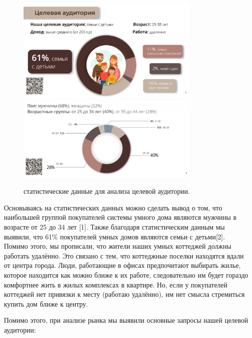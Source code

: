 \begin{figure}[h!]
	\centering
	\includegraphics[width=0.8\textwidth]{./graphics/img/image32.png}
	\includegraphics[width=0.8\textwidth]{./graphics/img/image14.png}
	\caption{статистические данные для анализа целевой аудитории.}
\end{figure}

Основываясь на статистических данных можно сделать вывод о том, что наибольшей группой покупателей системы умного дома являются мужчины в возрасте от 25 до 34 лет [1]. Также благодаря статистическим данным мы выявили, что 61\% покупателей умных домов являются семьи с детьми[2]. Помимо этого, мы прописали, что жители наших умных коттеджей должны работать удалённо. Это связано с тем, что коттеджные поселки находятся вдали от центра города. Люди, работающие в офисах предпочитают выбирать жилье, которое находится как можно ближе к их работе, следовательно им будет гораздо комфортнее жить в жилых комплексах в квартире. Но, если у покупателей коттеджей нет привязки к месту (работаю удалённо), им нет смысла стремиться купить дом ближе к центру. 

Помимо этого, при анализе рынка мы выявили основные запросы нашей целевой аудитории:

